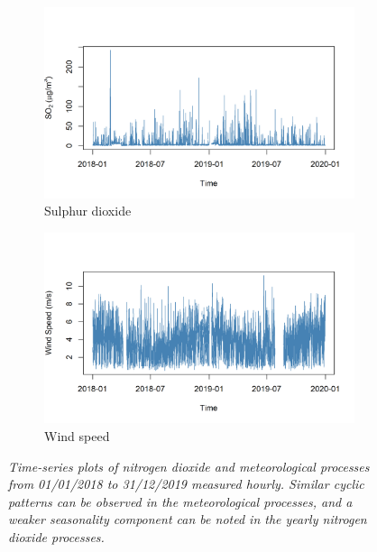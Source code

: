 \begin{figure}[H]
            \vspace{0.5em}

            \begin{subfigure}{0.48\linewidth}
               \centering
               \includegraphics[width=\linewidth]{../images/extracted_so2.png}
            \caption{Sulphur dioxide}
            \end{subfigure}
            \hfill
            \begin{subfigure}{0.48\linewidth}
               \centering
               \includegraphics[width=\linewidth]{../images/extracted_speed.png}
               \caption{Wind speed}
            \end{subfigure}

            \caption{\textit{Time-series plots of nitrogen dioxide and meteorological processes from 01/01/2018 to 31/12/2019 measured hourly. Similar cyclic patterns can be observed in the meteorological processes, and a weaker seasonality component can be noted in the yearly nitrogen dioxide processes.}}
         \end{figure}

